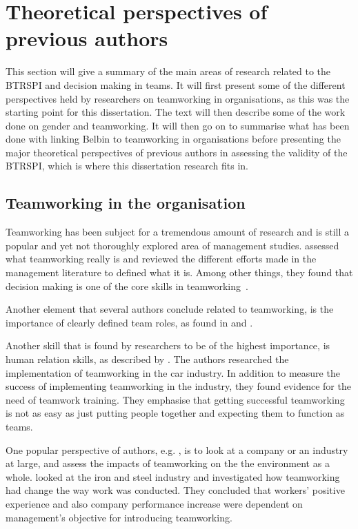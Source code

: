 \documentclass[a4paper,12pt,titlepage]{report}
\begin{document}
  \section{Theoretical perspectives of previous authors}

  This section will give a summary of the main areas of
  research related to the BTRSPI and decision making in teams. It will first
  present some of the different perspectives held by researchers on teamworking
  in organisations, as this was the starting point for this dissertation.
  The text will then describe some of the work done
  on gender and teamworking. It will then go on to summarise
  what has been done with linking Belbin to
  teamworking in organisations before presenting the major theoretical perspectives
  of previous authors in assessing the validity of the BTRSPI,
  which is where this dissertation research fits in.

  \subsection{Teamworking in the organisation}
  Teamworking has been subject for a tremendous amount of research and is still
  a popular and yet not thoroughly explored area of management studies.
  \citet{escbjc} assessed what teamworking really is and reviewed the
  different efforts made in the management literature to defined what it is.
  Among other things, they found that decision making is one of the core
  skills in teamworking~\cite[343]{escbjc}. 

  Another element that several authors conclude related to teamworking, is
  the importance of clearly defined team roles, as found in 
  \citet{rdjlno} and \citet{cg}.
  
  Another skill that is found by researchers to be of the highest importance, is
  human relation skills, as described by \citet{dphh}. The authors researched the
  implementation of teamworking in the car industry. In addition to measure the success
  of implementing teamworking in the industry, they found evidence for the need of
  teamwork training. They emphasise that getting successful teamworking
  is not as easy as just putting people together and expecting them to function
  as teams.

  One popular perspective of authors, e.g. \citet{pfamampt},
  is to look at a company or an industry at large, and assess the
  impacts of teamworking on the the environment as a whole. \citet{nbpb}
  looked at the iron and steel industry and investigated
  how teamworking had change the way work was conducted. They concluded that
  workers' positive experience and also company performance increase were dependent
  on management's objective for introducing teamworking. 
\end{document}
